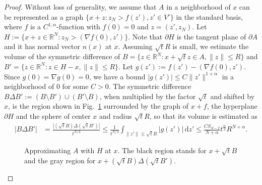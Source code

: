 \documentclass[graybox]{svmult}
\renewcommand{\d}{\mathrm{d}}  %
\newcommand{\R}{\mathbb{R}}  %
\renewcommand{\AA}{A}  %
\begin{document}
\begin{proof}
Without loss of generality, we assume that $\AA$  in a neighborhood of $x$ can be represented as a graph $\{x+z: z_N > f(z'), z' \in V'\}$  in the standard basis, where $f$ is a  $C^{1,\alpha}$-function with $f(0)=0$ and $z= (z', z_N)$. Let $H:=\{x+ z\in \R^N: z_N > (\nabla f(0), z')\}$. Note that $\partial H$ is the tangent plane of $\partial \AA$ and it has normal vector $n(x)$ at $x$.  
Assuming $\sqrt{t}R$ is small, we estimate the volume of the symmetric difference of $B=\{z \in \R^N: x+\sqrt{t}z \in \AA, \|z\|\leq R\}$ and $B'= \{z\in\R^N: z\in H-x, \|z\|\leq R\}$. Let $g(z'):= f(z') - (\nabla f(0),z').$ Since $g(0) = \nabla g(0)=0$, we have a bound $|g(z')| \le C\|z'\|^{1+\alpha}$ in a neighborhood of $0$ for some $C>0$. The symmetric difference $B\Delta B' := (B\setminus B') \cup (B'\setminus B)$, when multiplied by the factor $\sqrt{t}$ and shifted by $x$, is the region shown in Fig.~\ref{fig1} surrounded by the graph of $x+f$, the hyperplane $\partial H$ and the sphere of center $x$ and radius $\sqrt{t}R$, so that its volume is estimated as     
\begin{align}
 |B\Delta B'| &= \frac{ |(\sqrt{t}B)\Delta (\sqrt{t}B')|}{t^{N/2}} \le \frac1{t^{N/2}}\int_{\|z'\|\le \sqrt{t}R} |g(z')| \,\d z'  \le \frac{C S_{N-2}}{N+\alpha}  t^\frac{\alpha}{2}R^{N+\alpha}.    \label{eq:vol}
\end{align}
\begin{figure}[t]
\sidecaption[t]
\caption{Approximating $\AA$ with $H$ at $x$. The black region stands for $x+\sqrt{t}B$ and the gray region for $x+(\sqrt{t}B)\Delta (\sqrt{t}B')$.}\label{fig1}

\end{figure}
\end{proof}
\end{document}

